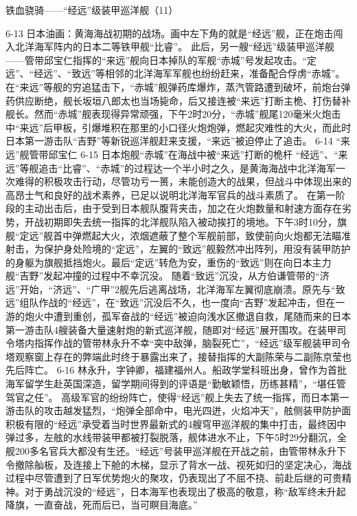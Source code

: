 \documentclass[12pt,UTF8]{ctexbook}
\begin{document}
铁血骁骑——“经远”级装甲巡洋舰（11）

6-13
日本油画：黄海海战初期的战场。画中左下角的就是“经远”舰，正在炮击闯入北洋海军阵内的日本二等铁甲舰“比睿”。
此后，另一艘“经远”级装甲巡洋舰——管带邱宝仁指挥的“来远”舰向日本掉队的军舰“赤城”号发起攻击。“定远”、“经远”、“致远”等相邻的北洋海军军舰也纷纷赶来，准备配合俘虏“赤城”。在“来远”等舰的穷追猛击下，“赤城”舰弹药库爆炸，蒸汽管路遭到破坏，前炮台弹药供应断绝，舰长坂垣八郎太也当场毙命，后又接连被“来远”打断主桅、打伤替补舰长。然而“赤城”舰表现得异常顽强，下午2时20分，“赤城”舰尾120毫米火炮击中“来远”后甲板，引爆堆积在那里的小口径火炮炮弹，燃起灾难性的大火，而此时日本第一游击队“吉野”等新锐巡洋舰赶来支援，“来远”被迫停止了追击。
6-14 “来远”舰管带邱宝仁
6-15 日本炮舰“赤城”在海战中被“来远”打断的桅杆
“经远”、“来远”等舰追击“比睿”、“赤城”的过程达一个半小时之久，是黄海海战中北洋海军一次难得的积极攻击行动，尽管功亏一篑，未能创造大的战果，但战斗中体现出来的高昂士气和良好的战术素养，已足以说明北洋海军官兵的战斗素质了。
在第一阶段的主动出击后，由于受到日本舰队腹背夹击，加之在火炮数量和射速方面存在劣势，开战初期即失去统一指挥的北洋舰队陷入被动挨打的境地。下午3时10分，旗舰“定远”舰首中弹燃起大火，浓烟遮蔽了整个军舰前部，致使前向火炮都无法瞄准射击，为保护身处险境的“定远”，左翼的“致远”舰毅然冲出阵列，用没有装甲防护的身躯为旗舰抵挡炮火。最后“定远”转危为安，重伤的“致远”则在向日本主力舰“吉野”发起冲撞的过程中不幸沉没。
随着“致远”沉没，从方伯谦管带的“济远”开始，“济远”、“广甲”2舰先后逃离战场，北洋海军左翼彻底崩溃。原先与“致远”组队作战的“经远”，在“致远”沉没后不久，也一度向“吉野”发起冲击，但在一游的炮火中遭到重创，孤军奋战的“经远”被迫向浅水区撤退自救，尾随而来的日本第一游击队4艘装备大量速射炮的新式巡洋舰，随即对“经远”展开围攻。在装甲司令塔内指挥作战的管带林永升不幸“突中敌弹，脑裂死亡”，“经远”级军舰装甲司令塔观察窗上存在的弊端此时终于暴露出来了，接替指挥的大副陈荣与二副陈京莹也先后阵亡。
6-16
林永升，字钟卿，福建福州人。船政学堂科班出身，曾作为首批海军留学生赴英国深造，留学期间得到的评语是“勤敏颖悟，历练甚精”，“堪任管驾官之任”。
高级军官的纷纷阵亡，使得“经远”舰上失去了统一指挥，而日本第一游击队的攻击越发猛烈，“炮弹全部命中，电光四迸，火焰冲天”，舷侧装甲防护面积极有限的“经远”承受着当时世界最新式的4艘穹甲巡洋舰的集中打击，最终因中弹过多，左舷的水线带装甲都被打裂脱落，舰体进水不止，下午5时29分翻沉，全舰200多名官兵大都没有生还。“经远”号装甲巡洋舰在开战之前，由管带林永升下令撤除舢板，及连接上下舱的木梯，显示了背水一战、视死如归的坚定决心，海战过程中尽管遭到了日军优势炮火的聚攻，仍表现出了不屈不挠、前赴后继的可贵精神。对于勇战沉没的“经远”，日本海军也表现出了极高的敬意，称“敌军终未升起降旗，一直奋战，死而后已，当可瞑目海底。”
\end{document}
